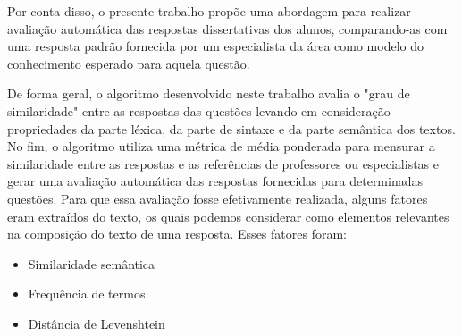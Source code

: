 Por conta disso, o presente trabalho propõe uma abordagem para realizar avaliação automática das respostas dissertativas dos alunos, comparando-as com uma resposta padrão fornecida por um especialista da área como modelo do conhecimento esperado para aquela questão.

De forma geral, o algoritmo desenvolvido neste trabalho avalia o "grau de similaridade" entre as respostas das questões levando em consideração propriedades da parte léxica, da parte de sintaxe e da parte semântica dos textos. No fim, o algoritmo utiliza uma métrica de média ponderada para mensurar a similaridade entre as respostas e as referências de professores ou especialistas e gerar uma avaliação automática das respostas fornecidas para determinadas questões. Para que essa avaliação fosse efetivamente realizada, alguns fatores eram extraídos do texto, os quais podemos considerar como elementos relevantes na composição do texto de uma resposta. Esses fatores foram:

\begin{itemize}
    \item Similaridade semântica
    \item Frequência de termos
    \item Distância de Levenshtein
\end{itemize}




